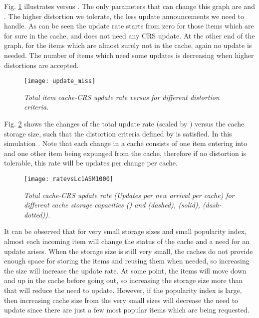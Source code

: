\documentclass[conference]{IEEEtran}
\theoremstyle{plain}
\theoremstyle{remark}
\begin{document}
Fig. \ref{fig:updatemiss} illustrates  versus . The only parameters that can change this graph are  and . The higher distortion we tolerate, the less update announcements we need to handle. As can be seen the update rate starts from zero for those items which are for sure in the cache, and does not need any CRS update. At the other end of the graph, for the items which are almost surely not in the cache, again no update is needed. The number of items which need some updates is decreasing when higher distortions are accepted.

\begin{figure}[http]
    \center
      \texttt{[image: update\_miss]}\\
      \caption{\textit{Total item  cache-CRS update rate versus  for different distortion criteria.}}
    \label{fig:updatemiss}
\end{figure}

Fig. \ref{fig:lruLc} shows the changes of the total update rate (scaled by ) versus the cache storage size, such that the distortion criteria defined by  is satisfied. In this simulation . Note that each change in a cache consists of one item entering into and one other item being expunged from the cache, therefore if no distortion is tolerable, this rate will be  updates per change per cache.

\begin{figure}[http]
    \center
      \texttt{[image: ratevsLc1ASM1000]}\\
      \caption{\textit{Total cache-CRS update rate (Updates per new arrival per cache) for different cache storage capacities () and (dashed), (solid), (dash-dotted)).}}
    \label{fig:lruLc}
\end{figure}

It can be observed that for very small storage sizes and small popularity index, almost each incoming item will change the status of the cache and a need for an update arises. When the storage size is still very small, the caches do not provide enough space for storing the items and reusing them when needed, so increasing the size will increase the update rate. At some point, the items will move down and up in the cache before going out, so increasing the storage size more than that will reduce the need to update. However, if the popularity index is large, then increasing cache size from the very small sizes will decrease the need to update since there are just a few most popular items which are being requested.
\end{document}
